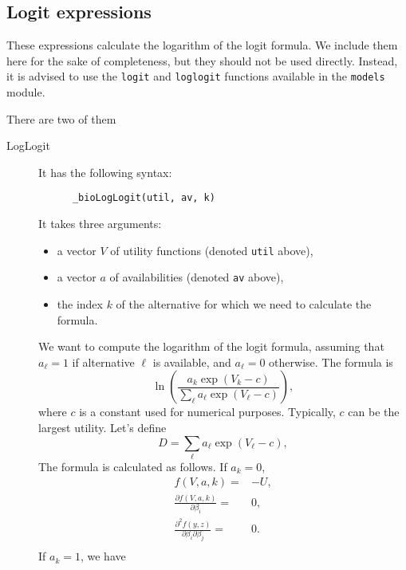 \documentclass[12pt,a4paper]{article}
\begin{document}
\subsection{Logit expressions}
These expressions calculate the logarithm of the logit formula. We include them here for the sake of completeness, but they should not be used directly. Instead, it is advised to use the \lstinline+logit+ and \lstinline+loglogit+ functions available in the \lstinline+models+ module.

There are two of them
\begin{description}
\item[LogLogit] It has the following syntax:
    \begin{lstlisting}
      _bioLogLogit(util, av, k)
  \end{lstlisting}
It takes three arguments:
\begin{itemize}
\item a vector $V$ of utility functions (denoted \verb+util+ above),
\item a vector $a$ of availabilities (denoted \verb+av+ above),
\item the index $k$ of the alternative for which we need to calculate the formula.
\end{itemize}
We want to compute the logarithm of the logit formula, assuming that $a_\ell=1$ if alternative $\ell$ is available, and $a_\ell=0$ otherwise. The formula is
\[
\ln\left(\frac{a_k\exp(V_k-c)}{\sum_\ell a_\ell\exp(V_\ell -c)}\right),
\]
where $c$ is a constant used for numerical purposes. Typically, $c$ can be the largest utility.
Let's define
\[
D = \sum_{\ell} a_\ell\exp(V_\ell - c),
\]
The formula is calculated as follows.
If $a_k = 0$,
  \begin{align*}
    f(V, a, k) =& -U, \\
    \frac{\partial f(V, a, k)}{\partial \beta_i} =&  0, \\ 
    \frac{\partial^2 f(y, z)}{\partial \beta_i \partial \beta_j} =&0.\\
  \end{align*}
If $a_k = 1$, we have


\end{description}
\end{document}
